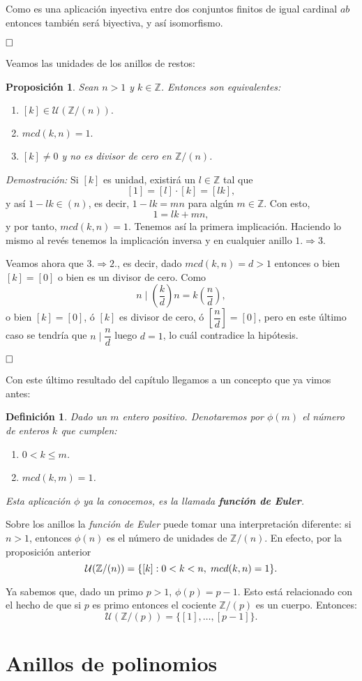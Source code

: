 \documentclass[12pt]{article}
\newtheorem{proposition}[theorem]{Proposición}
\newtheorem{definition}[theorem]{Definición}
\begin{document}
Como es una aplicación inyectiva entre dos conjuntos finitos de igual cardinal $ab$ entonces también será biyectiva, y así isomorfismo.

$\hfill \square$

Veamos las unidades de los anillos de restos:

\begin{proposition} Sean $n >1$ y $k \in \mathbb{Z}$. Entonces son equivalentes: \begin{enumerate}
\item $[k] \in \mathcal{U}(\mathbb{Z}/(n)).$
\item $mcd (k,n) = 1.$
\item $[k] \neq 0$ y no es divisor de cero en $\mathbb{Z}/(n)$.
\end{enumerate}
\end{proposition}
\emph{Demostración: } Si $[k]$ es unidad, existirá un $l \in \mathbb{Z}$ tal que $$[1] = [l] \cdot [k] = [lk],$$ y así $1-lk \in (n)$, es decir, $1-lk = mn$ para algún $m \in \mathbb{Z}$. Con esto, $$1 = lk  + mn,$$ y por tanto, $mcd(k,n) = 1$. Tenemos así la primera implicación. Haciendo lo mismo al revés tenemos la implicación inversa y en cualquier anillo $1.\Rightarrow 3.$

Veamos ahora que $3. \Rightarrow 2.$, es decir, dado $mcd(k,n) = d>1$ entonces o bien $[k] = [0]$ o bien es un divisor de cero. Como $$n \mid \left( \dfrac{k}{d}\right) n = k\left( \dfrac{n}{d}\right),$$ o bien $[k] = [0]$, ó $[k]$ es divisor de cero, ó $\left[\dfrac{n}{d} \right] = [0]$, pero en este último caso se tendría que $n \mid \dfrac{n}{d}$ luego $d = 1$, lo cuál contradice la hipótesis.

$\hfill \square$

Con este último resultado del capítulo llegamos a un concepto que ya vimos antes:
 
\begin{definition} Dado un $m$ entero positivo. Denotaremos por $\phi (m)$ el número de enteros $k$ que cumplen: \begin{enumerate}
\item $0 < k \leq m$.
\item $mcd(k,m) = 1$.
\end{enumerate}
Esta aplicación $\phi$ ya la conocemos, es la llamada \textbf{función de Euler}.
\end{definition}

Sobre los anillos la \textit{función de Euler} puede tomar una interpretación diferente: si $n>1$, entonces $\phi(n)$ es el número de unidades de $\mathbb{Z}/(n)$. En efecto, por la proposición anterior $$\mathcal{U}(\mathbb{Z}/(n)) = \lbrace [k]: 0 < k < n, \hspace{0.1cm} mcd(k,n) = 1 \rbrace.$$

Ya sabemos que, dado un primo $p>1$, $\phi(p) = p-1$. Esto está relacionado con el hecho de que si $p$ es primo entonces el cociente $\mathbb{Z}/(p)$ es un cuerpo. Entonces: $$\mathcal{U}(\mathbb{Z}/(p)) = \lbrace [1], \ldots, [p-1] \rbrace.$$

\section{Anillos de polinomios}
\end{document}
